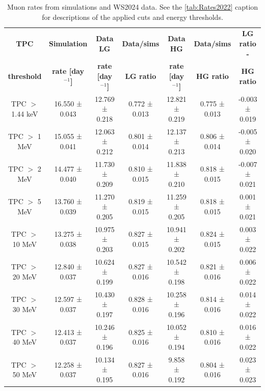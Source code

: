 \begin{center}
\begin{minipage}{\textwidth}
\def\arraystretch{1.4}%
\centering
\begin{longtable}[hbtp]{|c|c|c|c|c|c|c|}
\caption{Muon rates from simulations and WS2024 data. See the \autoref{tab:Rates2022} caption for descriptions of the applied cuts and energy thresholds.}
\label{tab:Rates2024} \\
\hline
\multicolumn{1}{|c|}{\textbf{TPC}} & \multicolumn{1}{c|}{\textbf{Simulation}} & \multicolumn{1}{c|}{\textbf{Data LG}} & \multicolumn{1}{c|}{\textbf{Data/sims}} & \multicolumn{1}{c|}{\textbf{Data HG}} & \multicolumn{1}{c|}{\textbf{Data/sims}} & \multicolumn{1}{c|}{\textbf{LG ratio - }} \\ 
\multicolumn{1}{|c|}{\textbf{threshold}} & \multicolumn{1}{c|}{\textbf{rate [day$^{-1}$]}} & \multicolumn{1}{c|}{\textbf{rate [day$^{-1}$]}} & \multicolumn{1}{c|}{\textbf{LG ratio}} & \multicolumn{1}{c|}{\textbf{rate [day$^{-1}$]}} & \multicolumn{1}{c|}{\textbf{HG ratio}} & \multicolumn{1}{c|}{\textbf{HG ratio}} \\ \hline 
\endfirsthead \hline
\endlastfoot
TPC $>$ 1.44 keV & 16.550 ± 0.043 & 12.769 ± 0.218 & 0.772 ± 0.013  & 12.821 ± 0.219 & 0.775 ± 0.013  &-0.003 ± 0.019 \\ \hline
TPC $>$ 1 MeV & 15.055 ± 0.041 & 12.063 ± 0.212 & 0.801 ± 0.014  & 12.137 ± 0.213 & 0.806 ± 0.014  &-0.005 ± 0.020 \\ \hline
TPC $>$ 2 MeV & 14.477 ± 0.040 & 11.730 ± 0.209 & 0.810 ± 0.015  & 11.838 ± 0.210 & 0.818 ± 0.015  &-0.007 ± 0.021 \\ \hline
TPC $>$ 5 MeV & 13.760 ± 0.039 & 11.270 ± 0.205 & 0.819 ± 0.015  & 11.259 ± 0.205 & 0.818 ± 0.015  & 0.001 ± 0.021 \\ \hline
TPC $>$ 10 MeV & 13.275 ± 0.038 & 10.975 ± 0.203 & 0.827 ± 0.015  & 10.941 ± 0.202 & 0.824 ± 0.015  & 0.003 ± 0.022 \\ \hline
TPC $>$ 20 MeV & 12.840 ± 0.037 & 10.624 ± 0.199 & 0.827 ± 0.016  & 10.542 ± 0.198 & 0.821 ± 0.016  & 0.006 ± 0.022 \\ \hline
TPC $>$ 30 MeV & 12.597 ± 0.037 & 10.430 ± 0.197 & 0.828 ± 0.016  & 10.258 ± 0.196 & 0.814 ± 0.016  & 0.014 ± 0.022 \\ \hline
TPC $>$ 40 MeV & 12.413 ± 0.037 & 10.246 ± 0.196 & 0.825 ± 0.016  & 10.052 ± 0.194 & 0.810 ± 0.016  & 0.016 ± 0.022 \\ \hline
TPC $>$ 50 MeV & 12.258 ± 0.037 & 10.134 ± 0.195 & 0.827 ± 0.016  &  9.858 ± 0.192 & 0.804 ± 0.016  & 0.023 ± 0.023 \\
\hline
\end{longtable}
\end{minipage}%
\end{center}

